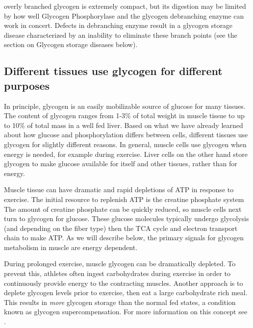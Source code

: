 \documentclass{tufte-handout}
\begin{document}
 overly branched glycogen is extremely compact, but its digestion may be limited by how well Glycogen Phosphorylase and the glycogen debranching enzyme can work in concert.  Defects in debranching enzyme result in a glycogen storage disease characterized by an inability to eliminate these branch points (see the section on Glycogen storage diseases below).

\subsection{Different tissues use glycogen for different purposes}

In principle, glycogen is an easily mobilizable source of glucose for many tissues.  The content of glycogen ranges from 1-3\% of total weight in muscle tissue to up to 10\% of total mass in a well fed liver.  Based on what we have already learned about how glucose and phosphorylation differs between cells, different tissues use glycogen for slightly different reasons.  In general, muscle cells use glycogen when energy is needed, for example during exercise.  Liver cells on the other hand store glycogen to make glucose available for itself and other tissues, rather than for energy.

   Muscle tissue can have dramatic and rapid depletions of ATP in response to exercise.  The initial resource to replenish ATP is the creatine phosphate system  The amount of creatine phosphate can be quickly reduced, so muscle cells next turn to glycogen for glucose.  These glucose molecules typically undergo glycolysis (and depending on the fiber type) then the TCA cycle and electron transport chain to make ATP. As we will describe below, the primary signals for glycogen metabolism in muscle are energy dependent.

  During prolonged exercise, muscle glycogen can be dramatically depleted.  To prevent this, athletes often ingest carbohydrates during exercise in order to continuously provide energy to the contracting muscles.  Another approach is to deplete glycogen levels prior to exercise, then eat a large carbohydrate rich meal.  This results in \emph{more} glycogen storage than the normal fed states, a condition known as glycogen supercompensation.  For more information on this concept see \citet{Hawley1997}.  
\end{document}
